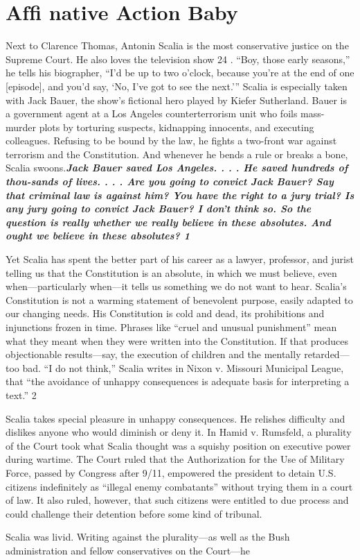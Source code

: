{\chapter{Afﬁ native Action Baby} } {\label{Afﬁ native Action Baby} }{\par}{\textit{	} } {\par}{\par} {\textbf{\textit{	} } } {\par} 
	Next to Clarence Thomas, Antonin Scalia is the most conservative justice on the Supreme Court. He also loves the television show {\color{blue} 24 }. “Boy, those early seasons,” he tells his biographer, “I’d be up to two o’clock, because you’re at the end of one [episode], and you’d say, ‘No, I’ve got to see the next.’” Scalia is especially taken with Jack Bauer, the show’s fictional hero played by Kiefer Sutherland. Bauer is a government agent at a Los Angeles counterterrorism unit who foils mass-murder plots by torturing suspects, kidnapping innocents, and executing colleagues. Refusing to be bound by the law, he fights a two-front war against terrorism and the Constitution. And whenever he bends a rule or breaks a bone, Scalia swoons.{\textbf{\textit{Jack Bauer saved Los Angeles. . . . He saved hundreds of thou-sands of lives. . . . Are you going to convict Jack Bauer? Say that criminal law is against him? You have the right to a jury trial? Is any jury going to convict Jack Bauer? I don’t think so. So the question is really whether we really believe in these absolutes. And ought we believe in these absolutes? 1} }} {\par} Yet Scalia has spent the better part of his career as a lawyer, professor, and jurist telling us that the Constitution is an absolute, in which we must believe, even when—particularly when—it tells us something we do not want to hear. Scalia’s Constitution is not a warming statement of benevolent purpose, easily adapted to our changing needs. His Constitution is cold and dead, its prohibitions and injunctions frozen in time. Phrases like “cruel and unusual punishment” mean what they meant when they were written into the Constitution. If that produces objectionable results—say, the execution of children and the mentally retarded—too bad. “I do not think,” Scalia writes in Nixon v. Missouri Municipal League, that “the avoidance of unhappy consequences is adequate basis for interpreting a text.” {\color{blue} 2 } {\par} Scalia takes special pleasure in unhappy consequences. He relishes difficulty and dislikes anyone who would diminish or deny it. In Hamid v. Rumsfeld, a plurality of the Court took what Scalia thought was a squishy position on executive power during wartime. The Court ruled that the Authorization for the Use of Military Force, passed by Congress after 9/11, empowered the president to detain U.S. citizens indefinitely as “illegal enemy combatants” without trying them in a court of law. It also ruled, however, that such citizens were entitled to due process and could challenge their detention before some kind of tribunal.{\par} Scalia was livid. Writing against the plurality—as well as the Bush administration and fellow conservatives on the Court—he 